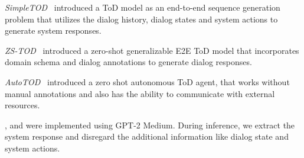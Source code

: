 \noindent
\textit{SimpleTOD}~\cite{Chen2022KETODKT} introduced a ToD model as an end-to-end sequence generation problem that utilizes the dialog history, dialog states and system actions to generate system responses.

\noindent
\textit{ZS-TOD}~\cite{Mosharrof2023ZeroShotGE} introduced a zero-shot generalizable E2E ToD model that incorporates domain schema and dialog annotations to generate dialog responses.

\noindent
\textit{AutoTOD}~\cite{Xu2024RethinkingTD} introduced a zero shot autonomous ToD agent, that works without manual annotations and also has the ability to communicate with external resources.

{\soloist}, {\simpletod} and {\zstod} were implemented using GPT-2 Medium. During inference, we extract the system response and disregard the additional information like dialog state and system actions.